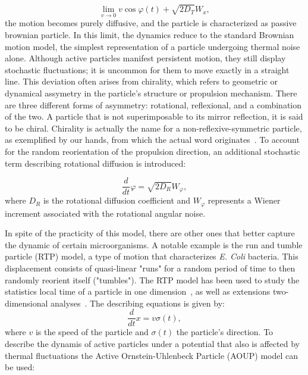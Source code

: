 \begin{equation}
  \lim_{v \to 0}  v\cos{\varphi(t)} + \sqrt{2D_T}W_x,
  \label{eq:limitofvelocity}
\end{equation}
the motion becomes purely diffusive, and the particle is characterized as passive brownian particle. In this limit, the dynamics reduce to the standard Brownian motion model, the simplest representation of a particle undergoing thermal noise alone.
Although active particles manifest persistent motion, they still display stochastic fluctuations; it is uncommon for them to move exactly in a straight line. This deviation often arises from chirality, which refers to geometric or dynamical assymetry in the particle's structure or propulsion mechanism. There are three different forms of asymmetry: rotational, reflexional, and a combination of the two. A particle that is not superimposable to its mirror reflection, it is said to be chiral. Chirality is actually the name for a non-reflexive-symmetric particle, as exemplified by our hands, from which the actual word originates~\cite{cahn1966specification}. To account for the random reorientation of the propulsion direction, an additional stochastic term describing rotational diffusion is introduced:

\begin{equation}
  \frac{d}{dt}{\varphi} = \sqrt{2D_R}W _{\varphi},
  \label{eq:rotationaldiffusion}
\end{equation}
where $D_R$ is the rotational diffusion coefficient and $W_\varphi$ represents a Wiener increment associated with the rotational angular noise.

In spite of the practicity of this model, there are other ones that better capture the dynamic of certain microorganisms. A notable example is the run and tumble particle (RTP) model, a type of motion that characterizes \textit{E. Coli} bacteria. This displacement consists of quasi-linear "runs" for a random period of time to then randomly reorient itself ("tumbles"). The RTP model has been used to study the statistics local time of a particle in one dimension~\cite{singh2021local}, as well as extensions two-dimensional analyses~\cite{santra2020run}.
The describing equations is given by:
\begin{equation}
  \frac{d}{dt}x = v\sigma (t), 
  \label{eq:runandthumble}
\end{equation}
where $v$ is the speed of the particle and $\sigma (t)$ the particle's direction. 
To describe the dynamis of active particles under a potential that also is affected by thermal fluctuations the Active Ornstein-Uhlenbeck Particle (AOUP) model can be used:

